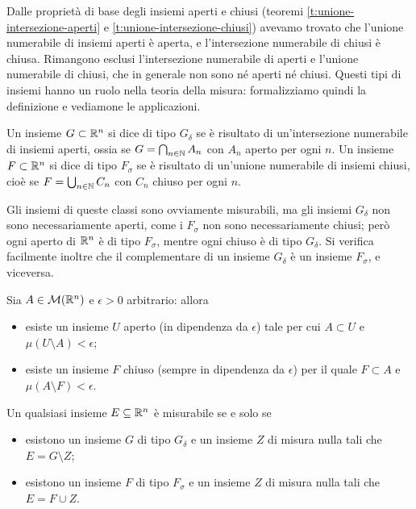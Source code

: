 Dalle proprietà di base degli insiemi aperti e chiusi (teoremi \ref{t:unione-intersezione-aperti} e \ref{t:unione-intersezione-chiusi}) avevamo trovato che l'unione numerabile di insiemi aperti è aperta, e l'intersezione numerabile di chiusi è chiusa.
Rimangono esclusi l'intersezione numerabile di aperti e l'unione numerabile di chiusi, che in generale non sono n\'e aperti n\'e chiusi.
Questi tipi di insiemi hanno un ruolo nella teoria della misura: formalizziamo quindi la definizione e vediamone le applicazioni.
\begin{definizione} \label{d:gdelta-fsigma}
	Un insieme $G\subset\mathbb{R}^n$ si dice di tipo $G_\delta$ se è risultato di un'intersezione numerabile di insiemi aperti, ossia se $G=\bigcap_{n\in\mathbb{N}}A_n$ con $A_n$ aperto per ogni $n$.
	Un insieme $F\subset\mathbb{R}^n$ si dice di tipo $F_\sigma$ se è risultato di un'unione numerabile di insiemi chiusi, cioè se $F=\bigcup_{n\in\mathbb{N}}C_n$ con $C_n$ chiuso per ogni $n$.
\end{definizione}
Gli insiemi di queste classi sono ovviamente misurabili, ma gli insiemi $G_\delta$ non sono necessariamente aperti, come i $F_\sigma$ non sono necessariamente chiusi; però ogni aperto di $\mathbb{R}^n$ è di tipo $F_\sigma$, mentre ogni chiuso è di tipo $G_\delta$.
Si verifica facilmente inoltre che il complementare di un insieme $G_\delta$ è un insieme $F_\sigma$, e viceversa.
\begin{lemma} \label{l:aperti-chiusi-poco-differenti}
	Sia $A\in\mathcal M(\mathbb{R}^n)$ e $\epsilon>0$ arbitrario: allora
	\begin{itemize}
		\item esiste un insieme $U$ aperto (in dipendenza da $\epsilon$) tale per cui $A\subset U$ e $\mu(U\setminus A)<\epsilon$;
		\item esiste un insieme $F$ chiuso (sempre in dipendenza da $\epsilon$) per il quale $F\subset A$ e $\mu(A\setminus F)<\epsilon$.
	\end{itemize}
\end{lemma}
\begin{teorema} \label{t:gdelta-fsigma-misurabili}
	Un qualsiasi insieme $E\subseteq\mathbb{R}^n$ è misurabile se e solo se
	\begin{itemize}
		\item esistono un insieme $G$ di tipo $G_\delta$ e un insieme $Z$ di misura nulla tali che $E=G\setminus Z$;
		\item esistono un insieme $F$ di tipo $F_\sigma$ e un insieme $Z$ di misura nulla tali che $E=F\cup Z$.
	\end{itemize}
\end{teorema}
